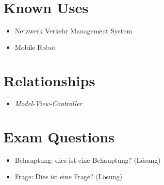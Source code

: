 \section{Known Uses}
\begin{itemize}
	\item Netzwerk Verkehr Management System
	\item Mobile Robot
\end{itemize}

\section{Relationships}
\begin{itemize}
	\item \textit{Model-View-Controller} 
\end{itemize}

\section{Exam Questions}
\begin{itemize}
  \item Behauptung: dies ist eine Behauptung? (Lösung)
    \item Frage: Dies ist eine Frage? (Lösung)
\end{itemize}
